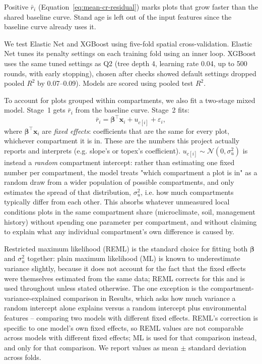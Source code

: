 \documentclass[logo,msc,ai]{infthesis}           %
\begin{document}
Positive $\bar r_i$ (Equation~\eqref{eq:mean-cr-residual}) marks plots that grow faster than the shared baseline curve. Stand age is left out of the input features since the baseline curve already uses it.

We test Elastic Net and XGBoost using five-fold spatial cross-validation. Elastic Net tunes its penalty settings on each training fold using an inner loop. XGBoost uses the same tuned settings as Q2 (tree depth 4, learning rate 0.04, up to 500 rounds, with early stopping), chosen after checks showed default settings dropped pooled $R^2$ by 0.07--0.09). Models are scored using pooled test $R^2$.

To account for plots grouped within compartments, we also fit a two-stage mixed model. Stage~1 gets $\bar r_i$ from the baseline curve. Stage~2 fits:
\begin{equation}
\bar r_i=\boldsymbol{\beta}^{\top}\mathbf{x}_i+u_{c[i]}+\varepsilon_i,
\label{eq:mixed-effects}
\end{equation}
where $\boldsymbol{\beta}^{\top}\mathbf{x}_i$ are \emph{fixed effects}: coefficients that are the same for every plot, whichever compartment it is in. These are the numbers this project actually reports and interprets (e.g. slope's or topex's coefficient). $u_{c[i]}\sim\mathcal{N}(0,\sigma_u^2)$ is instead a \emph{random} compartment intercept: rather than estimating one fixed number per compartment, the model treats "which compartment a plot is in" as a random draw from a wider population of possible compartments, and only estimates the spread of that distribution, $\sigma_u^2$, i.e. how much compartments typically differ from each other. This absorbs whatever unmeasured local conditions plots in the same compartment share (microclimate, soil, management history) without spending one parameter per compartment, and without claiming to explain what any individual compartment's own difference is caused by.

Restricted maximum likelihood (REML) is the standard choice for fitting both $\boldsymbol{\beta}$ and $\sigma_u^2$ together: plain maximum likelihood (ML) is known to underestimate variance slightly, because it does not account for the fact that the fixed effects were themselves estimated from the same data; REML corrects for this and is used throughout unless stated otherwise. The one exception is the compartment-variance-explained comparison in Results, which asks how much variance a random intercept alone explains versus a random intercept plus environmental features -- comparing two models with different fixed effects. REML's correction is specific to one model's own fixed effects, so REML values are not comparable across models with different fixed effects; ML is used for that comparison instead, and only for that comparison. We report values as mean $\pm$ standard deviation across folds.
\end{document}
